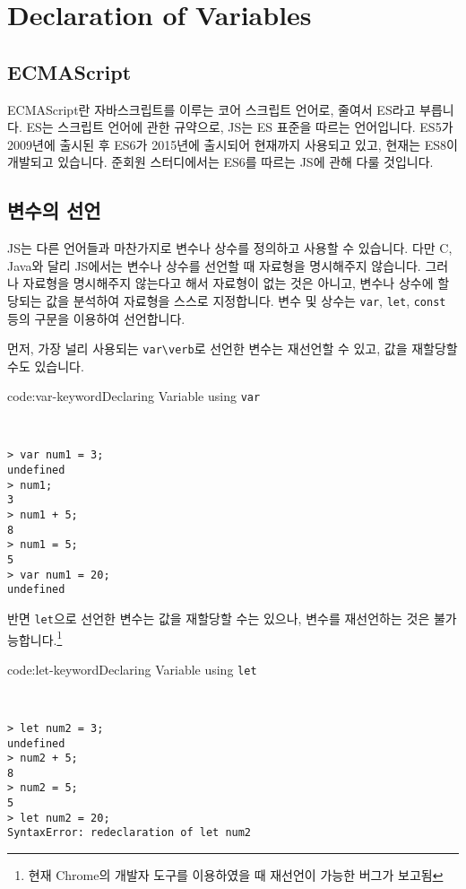 \section{Declaration of Variables} \label{sect:declaration-of-variables}

\subsection*{ECMAScript}

ECMAScript란 자바스크립트를 이루는 코어 스크립트 언어로, 줄여서 ES라고 부릅니다. ES는 스크립트 언어에 관한 규약으로, JS는 ES 표준을 따르는 언어입니다. ES5가 2009년에 출시된 후 ES6가 2015년에 출시되어 현재까지 사용되고 있고, 현재는 ES8이 개발되고 있습니다. 준회원 스터디에서는 ES6를 따르는 JS에 관해 다룰 것입니다.

\subsection*{변수의 선언}

JS는 다른 언어들과 마찬가지로 변수나 상수를 정의하고 사용할 수 있습니다. 다만 C, Java와 달리 JS에서는 변수나 상수를 선언할 때 자료형을 명시해주지 않습니다. 그러나 자료형을 명시해주지 않는다고 해서 자료형이 없는 것은 아니고, 변수나 상수에 할당되는 값을 분석하여 자료형을 스스로 지정합니다. 변수 및 상수는 \verb|var|, \verb|let|, \verb|const| 등의 구문을 이용하여 선언합니다. 

먼저, 가장 널리 사용되는 \verb|var\verb|로 선언한 변수는 재선언할 수 있고, 값을 재할당할 수도 있습니다.

\begin{codeenv}{code:var-keyword}{Declaring Variable using \texttt{var}}\begin{verbatim}


> var num1 = 3;
undefined
> num1;
3
> num1 + 5;
8
> num1 = 5;
5
> var num1 = 20;
undefined
\end{verbatim}
\end{codeenv}

반면 \verb|let|으로 선언한 변수는 값을 재할당할 수는 있으나, 변수를 재선언하는 것은 불가능합니다.\footnote{현재 Chrome의 개발자 도구를 이용하였을 때 재선언이 가능한 버그가 보고됨}

\begin{codeenv}{code:let-keyword}{Declaring Variable using \texttt{let}}\begin{verbatim}


> let num2 = 3;
undefined
> num2 + 5;
8
> num2 = 5;
5
> let num2 = 20;
SyntaxError: redeclaration of let num2
\end{verbatim}
\end{codeenv}

